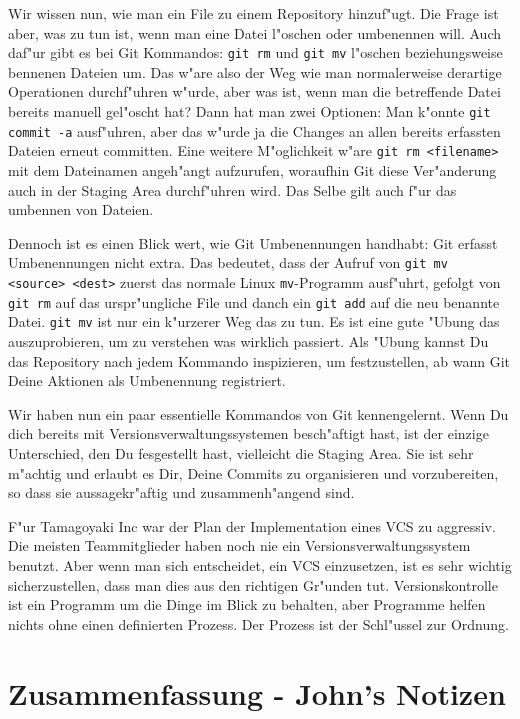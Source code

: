 Wir wissen nun, wie man ein File zu einem Repository hinzuf"ugt. Die Frage ist aber, was zu tun ist, wenn man eine Datei l"oschen oder umbenennen will. Auch daf"ur gibt es bei Git Kommandos: \texttt{git rm} und \texttt{git mv} l"oschen beziehungsweise bennenen Dateien um. Das w"are also der Weg wie man normalerweise derartige Operationen durchf"uhren w"urde, aber was ist, wenn man die betreffende Datei bereits manuell gel"oscht hat? Dann hat man zwei Optionen: Man k"onnte \texttt{git commit -a} ausf"uhren, aber das w"urde ja die Changes an allen bereits erfassten Dateien erneut committen. Eine weitere M"oglichkeit w"are \texttt{git rm <filename>} mit dem Dateinamen angeh"angt aufzurufen, woraufhin Git diese Ver"anderung auch in der Staging Area durchf"uhren wird. Das Selbe gilt auch f"ur das umbennen von Dateien.

Dennoch ist es einen Blick wert, wie Git Umbenennungen handhabt: Git erfasst Umbenennungen nicht extra. Das bedeutet, dass der Aufruf von \texttt{git mv <source> <dest>} zuerst das normale Linux \texttt{mv}-Programm ausf"uhrt, gefolgt von \texttt{git rm} auf das urspr"ungliche File und danch ein \texttt{git add} auf die neu benannte Datei. \texttt{git mv} ist nur ein k"urzerer Weg das zu tun. Es ist eine gute "Ubung das auszuprobieren, um zu verstehen was wirklich passiert. Als "Ubung kannst Du das Repository nach jedem Kommando inspizieren, um festzustellen, ab wann Git Deine Aktionen als Umbenennung registriert.

Wir haben nun ein paar essentielle Kommandos von Git kennengelernt. Wenn Du dich bereits mit Versionsverwaltungssystemen besch"aftigt hast, ist der einzige Unterschied, den Du fesgestellt hast, vielleicht die Staging Area. Sie ist sehr m"achtig und erlaubt es Dir, Deine Commits zu organisieren und vorzubereiten, so dass sie aussagekr"aftig und zusammenh"angend sind.

F"ur Tamagoyaki Inc war der Plan der Implementation eines VCS zu aggressiv. Die meisten Teammitglieder haben noch nie ein Versionsverwaltungssystem benutzt. Aber wenn man sich entscheidet, ein VCS einzusetzen, ist es sehr wichtig sicherzustellen, dass man dies aus den richtigen Gr"unden tut. Versionskontrolle ist ein Programm um die Dinge im Blick zu behalten, aber Programme helfen nichts ohne einen definierten Prozess. Der Prozess ist der Schl"ussel zur Ordnung.


\clearpage
\section{Zusammenfassung - John's Notizen}
